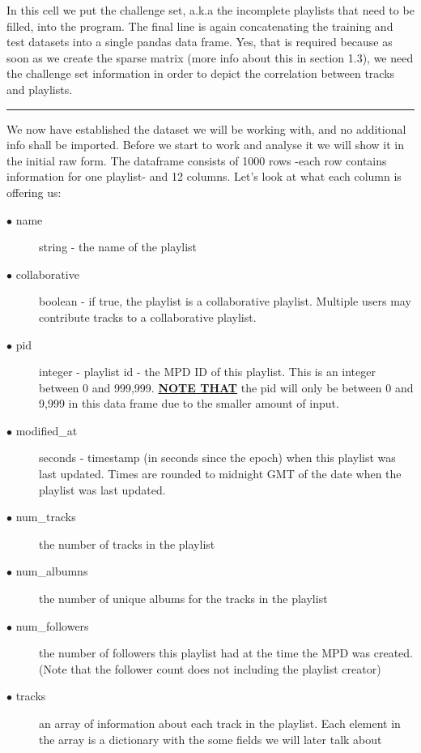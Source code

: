 \documentclass[]{article}
\begin{document}
In this cell we put the challenge set, a.k.a the incomplete playlists that need to be filled, into the program. The final line is again concatenating the training and test datasets into a single pandas data frame. Yes, that is required because as soon as we create the sparse matrix (more info about this in section 1.3), we need the challenge set information in order to depict the correlation between tracks and playlists. 
\\
\noindent
{\color{Blue} \rule{\linewidth}{0.5mm}}
We now have established the dataset we will be working with, and no additional info shall be imported. Before we start to work and analyse it we will show it in the initial raw form. The dataframe consists of 1000 rows -each row contains information for one playlist- and 12 columns. Let's look at what each column is offering us:
\begin{description}
	\item [$\bullet$ name] string - the name of the playlist
	\item [$\bullet$ collaborative] boolean - if true, the playlist is a collaborative playlist. Multiple users may contribute tracks to a collaborative playlist.
	\item [$\bullet$ pid] integer - playlist id - the MPD ID of this playlist. This is an integer between 0 and 999,999. \textbf{\underline{NOTE THAT}} the pid will only be between 0 and 9,999 in this data frame due to the smaller amount of input.   
	\item [$\bullet$ modified\_at] seconds - timestamp (in seconds since the epoch) when this playlist was last updated. Times are rounded to midnight GMT of the date when the playlist was last updated.
	\item[$\bullet$ num\_tracks] the number of tracks in the playlist
	\item[$\bullet$ num\_albumns] the number of unique albums for the tracks in the playlist
	\item[$\bullet$ num\_followers] the number of followers this playlist had at the time the MPD was created. (Note that the follower count does not including the playlist creator)
	\item[$\bullet$ tracks] an array of information about each track in the playlist. Each element in the array is a dictionary with the some fields we will later talk about

\end{description}
\end{document}
